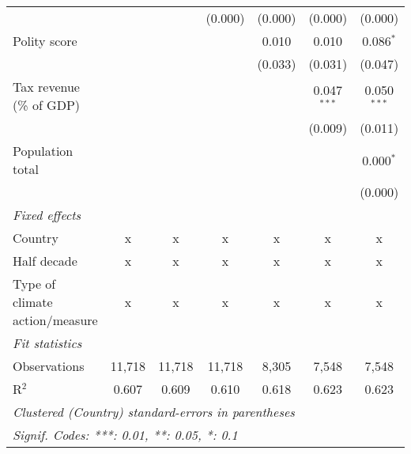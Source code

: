 \begin{tabular}{lcccccc}
                                                                            &         &                & (0.000)        & (0.000)        & (0.000)        & (0.000)\\   
   Polity score                                                             &         &                &                & 0.010          & 0.010          & 0.086$^{*}$\\   
                                                                            &         &                &                & (0.033)        & (0.031)        & (0.047)\\   
   Tax revenue (\% of GDP)                                                  &         &                &                &                & 0.047$^{***}$  & 0.050$^{***}$\\   
                                                                            &         &                &                &                & (0.009)        & (0.011)\\   
   Population total                                                         &         &                &                &                &                & 0.000$^{*}$\\   
                                                                            &         &                &                &                &                & (0.000)\\   
   \emph{Fixed effects}\\
   Country                                                                  & x       & x              & x              & x              & x              & x\\  
   Half decade                                                              & x       & x              & x              & x              & x              & x\\  
   Type of climate action/measure                                           & x       & x              & x              & x              & x              & x\\  
   \midrule \emph{Fit statistics}\\
   Observations                                                             & 11,718  & 11,718         & 11,718         & 8,305          & 7,548          & 7,548\\  
   R$^2$                                                                    & 0.607   & 0.609          & 0.610          & 0.618          & 0.623          & 0.623\\  
   \midrule
   \multicolumn{7}{l}{\emph{Clustered (Country) standard-errors in parentheses}}\\
   \multicolumn{7}{l}{\emph{Signif. Codes: ***: 0.01, **: 0.05, *: 0.1}}\\
\end{tabular}
\par\endgroup


